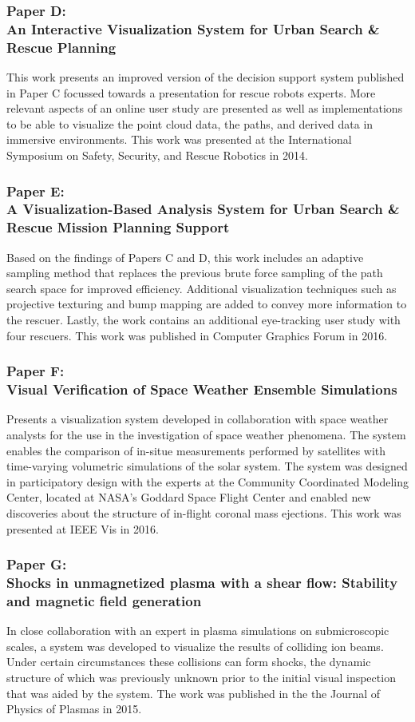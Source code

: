 \subsubsection{Paper D:\\An Interactive Visualization System for Urban Search \& Rescue Planning}
This work presents an improved version of the decision support system published in Paper C focussed towards a presentation for rescue robots experts. More relevant aspects of an online user study are presented as well as implementations to be able to visualize the point cloud data, the paths, and derived data in immersive environments. This work was presented at the International Symposium on Safety, Security, and Rescue Robotics in 2014.

\subsubsection{Paper E:\\A Visualization-Based Analysis System for Urban Search \& Rescue Mission Planning Support}
Based on the findings of Papers C and D, this work includes an adaptive sampling method that replaces the previous brute force sampling of the path search space for improved efficiency. Additional visualization techniques such as projective texturing and bump mapping are added to convey more information to the rescuer. Lastly, the work contains an additional eye-tracking user study with four rescuers. This work was published in Computer Graphics Forum in 2016.

\subsubsection{Paper F:\\Visual Verification of Space Weather Ensemble Simulations}
Presents a visualization system developed in collaboration with space weather analysts for the use in the investigation of space weather phenomena. The system enables the comparison of in-situe measurements performed by satellites with time-varying volumetric simulations of the solar system. The system was designed in participatory design with the experts at the Community Coordinated Modeling Center, located at NASA's Goddard Space Flight Center and enabled new discoveries about the structure of in-flight coronal mass ejections. This work was presented at IEEE Vis in 2016.

\subsubsection{Paper G:\\Shocks in unmagnetized plasma with a shear flow: Stability and magnetic field generation}
In close collaboration with an expert in plasma simulations on submicroscopic scales, a system was developed to visualize the results of colliding ion beams. Under certain circumstances these collisions can form shocks, the dynamic structure of which was previously unknown prior to the initial visual inspection that was aided by the system. The work was published in the the Journal of Physics of Plasmas in 2015.

